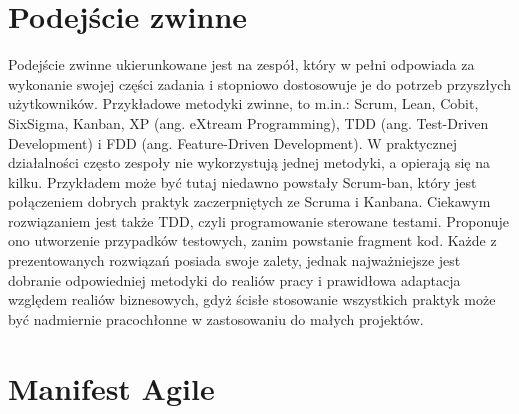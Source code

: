 \section{Podejście zwinne}

Podejście zwinne ukierunkowane jest na zespół, który w pełni odpowiada za wykonanie swojej części zadania i stopniowo dostosowuje je do potrzeb przyszłych użytkowników. Przykładowe metodyki zwinne, to m.in.: Scrum, Lean, Cobit, SixSigma, Kanban, XP (ang. eXtream Programming), TDD (ang. Test-Driven Development) i FDD (ang. Feature-Driven Development). W praktycznej działalności często zespoły nie wykorzystują jednej metodyki, a opierają się na kilku. Przykładem może być tutaj niedawno powstały Scrum-ban, który jest połączeniem dobrych praktyk zaczerpniętych ze Scruma i Kanbana.\cite{Wolf_2012} Ciekawym rozwiązaniem jest także TDD, czyli programowanie sterowane testami. Proponuje ono utworzenie przypadków testowych, zanim powstanie fragment kod.\cite{TDD_2015} Każde z prezentowanych rozwiązań posiada swoje zalety, jednak najważniejsze jest dobranie odpowiedniej metodyki do realiów pracy i prawidłowa adaptacja względem realiów biznesowych, gdyż ścisłe stosowanie wszystkich praktyk może być nadmiernie pracochłonne w zastosowaniu do małych projektów.

\section{Manifest Agile}

